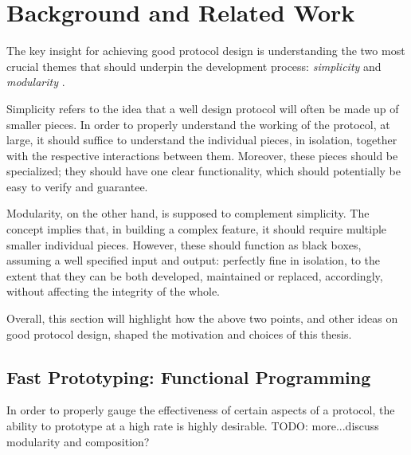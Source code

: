 \chapter{Background and Related Work}
The key insight for achieving good protocol design is understanding the two most crucial themes that should underpin the development process: \textit{simplicity} and \textit{modularity} \cite{ProtocolDesign}.

Simplicity refers to the idea that a well design protocol will often be made up of smaller pieces. In order to properly understand the working of the protocol, at large, it should suffice to understand the individual pieces, in isolation, together with the respective interactions between them. Moreover, these pieces should be specialized; they should have one clear functionality, which should potentially be easy to verify and guarantee.

Modularity, on the other hand, is supposed to complement simplicity. The concept implies that, in building a complex feature, it should require multiple smaller individual pieces. However, these should function as black boxes, assuming a well specified input and output: perfectly fine in isolation, to the extent that they can be both developed, maintained or replaced, accordingly, without affecting the integrity of the whole.

Overall, this section will highlight how the above two points, and other ideas on good protocol design, shaped the motivation and choices of this thesis.

\section{Fast Prototyping: Functional Programming}
In order to properly gauge the effectiveness of certain aspects of a protocol, the ability to prototype at a high rate is highly desirable.
TODO: more...discuss modularity and composition?

